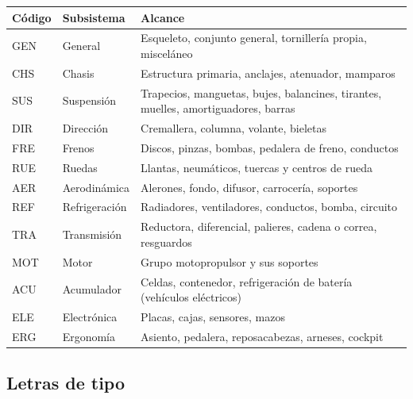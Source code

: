 \begin{center}
\begin{tabularx}{\textwidth}{@{}llX@{}}
\toprule
\textbf{Código} & \textbf{Subsistema} & \textbf{Alcance} \\
\midrule
\ttfamily GEN & General        & Esqueleto, conjunto general, tornillería propia, misceláneo \\
\ttfamily CHS & Chasis         & Estructura primaria, anclajes, atenuador, mamparos \\
\ttfamily SUS & Suspensión     & Trapecios, manguetas, bujes, balancines, tirantes, muelles, amortiguadores, barras \\
\ttfamily DIR & Dirección      & Cremallera, columna, volante, bieletas \\
\ttfamily FRE & Frenos         & Discos, pinzas, bombas, pedalera de freno, conductos \\
\ttfamily RUE & Ruedas         & Llantas, neumáticos, tuercas y centros de rueda \\
\ttfamily AER & Aerodinámica   & Alerones, fondo, difusor, carrocería, soportes \\
\ttfamily REF & Refrigeración  & Radiadores, ventiladores, conductos, bomba, circuito \\
\ttfamily TRA & Transmisión    & Reductora, diferencial, palieres, cadena o correa, resguardos \\
\ttfamily MOT & Motor          & Grupo motopropulsor y sus soportes \\
\ttfamily ACU & Acumulador     & Celdas, contenedor, refrigeración de batería (vehículos eléctricos) \\
\ttfamily ELE & Electrónica    & Placas, cajas, sensores, mazos \\
\ttfamily ERG & Ergonomía      & Asiento, pedalera, reposacabezas, arneses, cockpit \\
\bottomrule
\end{tabularx}
\end{center}


\subsection{Letras de tipo}

